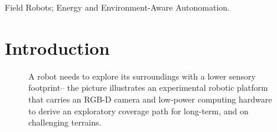 \documentclass[lettersize,journal,twoside]{IEEEtran}
\theoremstyle{definition}
\begin{document}
\begin{IEEEkeywords}
  Field Robots; Energy and Environment-Aware Autonomation.
\end{IEEEkeywords}



\section{Introduction}
\begin{figure}
       
  \caption{
    A robot needs to explore its surroundings with a lower sensory footprint--%
    the picture illustrates an experimental robotic platform that carries an RGB-D camera and low-power computing hardware to derive an exploratory coverage path for %
    long-term, and %
    on challenging terrains. %
  }
  \vspace*{-.2cm}
  \label{fig:0}
\end{figure}
\end{document}
